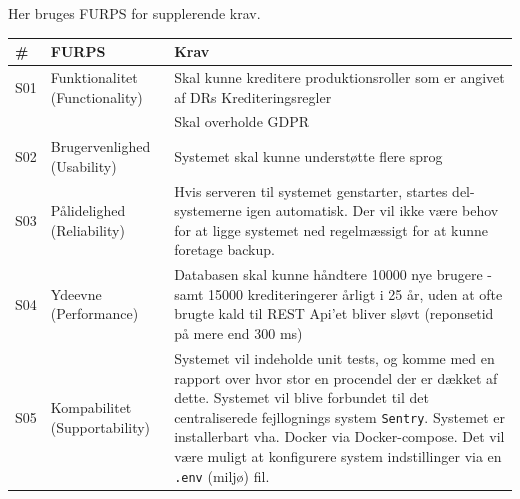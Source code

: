 Her bruges FURPS for supplerende krav.
\begin{table}[ht]
    \begin{tabularx}{\textwidth}{|p{1cm}|X|X|}
        \hline
        \textbf{\#} &   \textbf{FURPS}           &    \textbf{Krav} \\
        \hline
        S01 &   Funktionalitet (Functionality)           & Skal kunne kreditere produktionsroller som er angivet af DRs Krediteringsregler \\ & & Skal overholde GDPR \\
                                
        \hline
        S02 & Brugervenlighed (Usability)       & Systemet skal kunne understøtte flere sprog \\
        \hline
        S03 &   Pålidelighed (Reliability)     &  Hvis serveren til systemet genstarter, startes del-systemerne igen automatisk. Der vil ikke være behov for at ligge systemet ned regelmæssigt for at kunne foretage backup. \\
        \hline
        S04 &   Ydeevne (Performance)     &  Databasen skal kunne håndtere 10000 nye brugere - samt 15000 krediteringerer årligt i 25 år, uden at ofte brugte kald til REST Api'et bliver sløvt (reponsetid på mere end 300 ms) \\
        \hline
        S05 & Kompabilitet (Supportability)  &  Systemet vil indeholde unit tests, og komme med en rapport over hvor stor en procendel der er dækket af dette. %
        Systemet vil blive forbundet til det centraliserede fejllognings system \texttt{Sentry}.
        Systemet er installerbart vha. Docker via Docker-compose. %
        Det vil være muligt at konfigurere system indstillinger via en \texttt{.env} (miljø) fil.

\end{tabularx}
\end{table}
